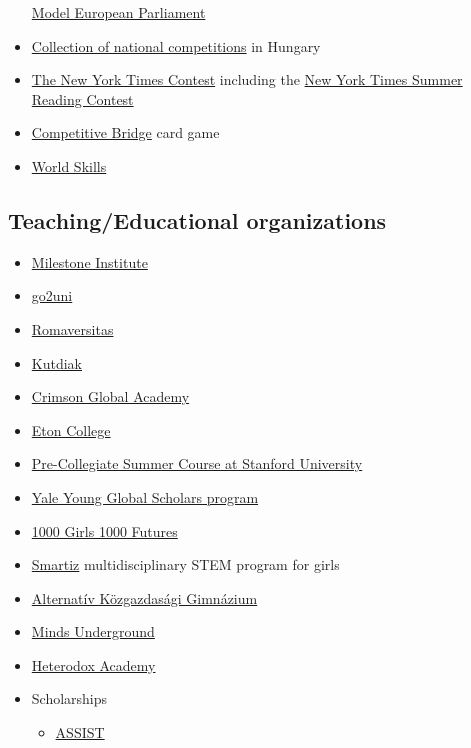 \documentclass{article}
\begin{document}
\begin{itemize}
    \href{https://mepeurope.eu/}{Model European Parliament}
    \item \href{https://tanulmanyiversenyek.hu/}{Collection of national competitions} in Hungary
    \item \href{https://www.nytimes.com/spotlight/learning-contests}{The New York Times Contest} including the \href{https://www.nytimes.com/2021/04/16/learning/our-12th-annual-summer-reading-contest.html}{New York Times Summer Reading Contest}
    \item \href{http://youth.worldbridge.org/}{Competitive Bridge} card game
    \item \href{https://worldskills.org/}{World Skills}
\end{itemize}

\subsection{Teaching/Educational organizations}

\begin{itemize}
    \item \href{https://milestone-institute.org/}{Milestone Institute}
    \item \href{https://www.euroexam.org/go2uni}{go2uni}
    \item \href{https://romaversitas.hu/en/}{Romaversitas}
    \item \href{https://www.kutdiak.hu/en/}{Kutdiak}
    \item \href{https://www.crimsonglobalacademy.school/uk/}{Crimson Global Academy}
    \item \href{https://www.etoncollege.com/}{Eton College}
    \item \href{https://summerinstitutes.spcs.stanford.edu/}{Pre-Collegiate Summer Course at Stanford University}
    \item \href{https://globalscholars.yale.edu/}{Yale Young Global Scholars program}
    \item \href{https://www.nyas.org/programs/global-stem-alliance/1000-girls-1000-futures/}{1000 Girls 1000 Futures}
    \item \href{https://nokatud.hu/smartiz/}{Smartiz} multidisciplinary STEM program for girls
    \item \href{https://www.akg.hu/}{Alternatív Közgazdasági Gimnázium}
    \item \href{https://www.mindsunderground.com/}{Minds Underground}
    \item \href{https://heterodoxacademy.org/}{Heterodox Academy}
    
    \item Scholarships
    \begin{itemize}
        \item \href{https://www.assistscholars.org/en/index}{ASSIST}
    \end{itemize}
\end{itemize}
\end{document}
